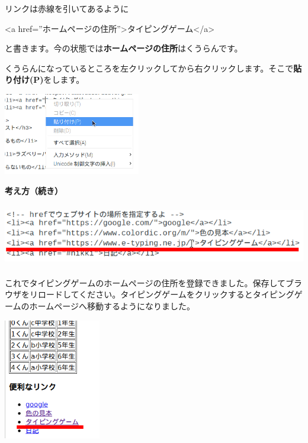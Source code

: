 \documentclass[a4paper,12pt]{jarticle}
\begin{document}
\bigskip
\flushleft

リンクは赤線を引いてあるように

{\textless}a
href=”ホームページの住所”{\textgreater}タイピングゲーム{\textless}/a{\textgreater}

と書きます。今の状態では\textbf{ホームページの住所}はくうらんです。

くうらんになっているところを左クリックしてから右クリックします。そこで\textbf{貼り付け(P)}をします。





\centering
\includegraphics[width=5.992cm,height=3.577cm]{textbook-img199.png}

\clearpage
\flushleft
\textbf{考え方（続き）}


\bigskip

\centering
\includegraphics[width=15.953cm,height=2.746cm]{textbook-img200.png}

\bigskip
\flushleft

これでタイピングゲームのホームページの住所を登録できました。保存してブラウザをリロードしてください。タイピングゲームをクリックするとタイピングゲームのホームページへ移動するようになりました。


\bigskip
\centering
\includegraphics[width=4.235cm,height=5.276cm]{textbook-img201.png}
\end{document}
